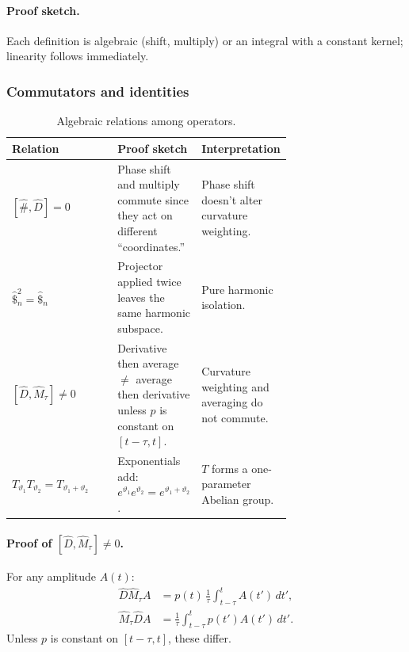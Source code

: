\paragraph{Proof sketch.} Each definition is algebraic (shift, multiply) or an integral with a constant kernel; linearity follows immediately.

\subsubsection{Commutators and identities}

\begin{table}[H]
  \small
  \centering
  \caption{Algebraic relations among operators.}
  \label{tab:operator-relations}
  \renewcommand{\arraystretch}{1.15}
  \begin{tabularx}{\linewidth}{@{}p{0.40\linewidth} p{0.30\linewidth} X@{}}
    \toprule
    \textbf{Relation}                                & \textbf{Proof sketch}                                                                                    & \textbf{Interpretation} \\
    \midrule
    \([\hat{\#},\hat{D}]=0\)                         & Phase shift and multiply commute since they act on different “coordinates.”                              & Phase shift doesn’t alter curvature weighting. \\
    \(\hat{\$}_{n}^{2}=\hat{\$}_{n}\)                & Projector applied twice leaves the same harmonic subspace.                                               & Pure harmonic isolation. \\
    \([\hat{D},\hat{M}_{\tau}]\neq 0\)               & Derivative then average \(\neq\) average then derivative unless \(p\) is constant on \([t-\tau,t]\).    & Curvature weighting and averaging do not commute. \\
    \(T_{\vartheta_{1}}T_{\vartheta_{2}}
       = T_{\vartheta_{1}+\vartheta_{2}}\)           & Exponentials add: \(e^{\vartheta_1}e^{\vartheta_2}=e^{\vartheta_1+\vartheta_2}\).                        & \(T\) forms a one-parameter Abelian group. \\
    \bottomrule
  \end{tabularx}
\end{table}

\paragraph{Proof of \([\hat{D},\hat{M}_{\tau}]\neq 0\).}
For any amplitude \(A(t)\):
\[
\begin{aligned}
  \hat{D}\hat{M}_{\tau}A
  &= p(t)\,\frac1\tau\int_{t-\tau}^{t}A(t')\,dt', \\
  \hat{M}_{\tau}\hat{D}A
  &= \frac1\tau\int_{t-\tau}^{t}p(t')A(t')\,dt'.
\end{aligned}
\]
Unless \(p\) is constant on \([t-\tau,t]\), these differ.

